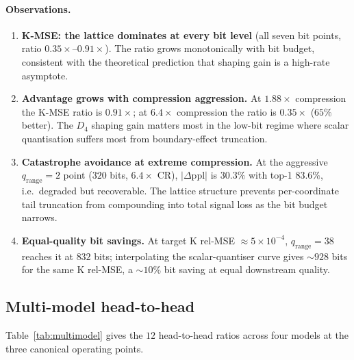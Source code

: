 \documentclass[11pt,a4paper]{article}
\theoremstyle{definition}
\theoremstyle{plain}
\newcommand{\abs}[1]{\left\lvert#1\right\rvert}
\begin{document}
\paragraph{Observations.}

\begin{enumerate}[leftmargin=*]
  \item \textbf{K-MSE: the lattice dominates at every bit level}
    (all seven bit points, ratio $0.35\times$--$0.91\times$). The
    ratio grows monotonically with bit budget, consistent with the
    theoretical prediction that shaping gain is a high-rate
    asymptote.
  \item \textbf{Advantage grows with compression aggression.} At
    $1.88\times$ compression the K-MSE ratio is $0.91\times$; at
    $6.4\times$ compression the ratio is $0.35\times$ ($65\%$
    better). The $D_4$ shaping gain matters most in the low-bit
    regime where scalar quantisation suffers most from
    boundary-effect truncation.
  \item \textbf{Catastrophe avoidance at extreme compression.} At
    the aggressive $q_\mathrm{range}=2$ point
    ($320$ bits, $6.4\times$ CR), $\abs{\Delta\mathrm{ppl}}$ is
    $30.3\%$ with top-1 $83.6\%$, i.e.\ degraded but recoverable.
    The lattice structure prevents per-coordinate tail truncation
    from compounding into total signal loss as the bit budget
    narrows.
  \item \textbf{Equal-quality bit savings.} At target K rel-MSE
    $\approx 5\times 10^{-4}$, $q_\mathrm{range}=38$ reaches it at
    $832$ bits; interpolating the scalar-quantiser curve gives
    $\sim\!928$ bits for the same K rel-MSE, a $\sim\!10\%$ bit
    saving at equal downstream quality.
\end{enumerate}

\subsection{Multi-model head-to-head}
\label{sec:bench-multi}

Table~\ref{tab:multimodel} gives the $12$ head-to-head ratios across
four models at the three canonical operating points.
\end{document}
